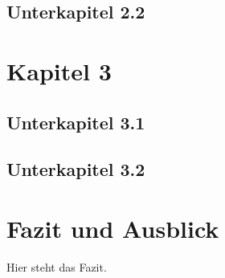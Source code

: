 \documentclass[a4paper, 12pt, oneside, openright]{article}
\begin{document}
\subsection{Unterkapitel 2.2}

\section{Kapitel 3}

\subsection{Unterkapitel 3.1}

\subsection{Unterkapitel 3.2}

\section{Fazit und Ausblick}
Hier steht das Fazit.

\newpage

\setcounter{page}{6}
{}
\printbibliography[title={Literaturverzeichnis}]
\end{document}
